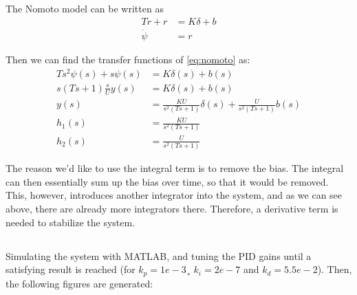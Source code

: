 The Nomoto model can be written as
\begin{equation}
\label{eq:nomoto}
	\begin{aligned}
		T \dot{r} + r &= K \delta + b \\
		\dot{\psi} &= r
	\end{aligned}
\end{equation}

Then we can find the transfer functions of \eqref{eq:nomoto} as: 
\begin{align*}
	T s^2 \psi(s) + s \psi(s) &= K \delta(s) + b(s) \\
	s(T s + 1) \frac{s}{U} y(s) &= K \delta(s) + b(s) \\
	y(s) &= \frac{K U}{s^2 (T s + 1)} \delta(s) + \frac{U}{s^2 (T s + 1)} b(s) \\ 
	h_1(s) &= \frac{K U}{s^2 (T s + 1)} \\
	h_2(s) &= \frac{U}{s^2 (T s + 1)}
\end{align*}

The reason we'd like to use the integral term is to remove the bias. The integral can then essentially sum up the bias over time, so that it would be removed. This, however, introduces another integrator into the system, and as we can see above, there are already more integrators there. Therefore, a derivative term is needed to stabilize the system.

\subsection{}
Simulating the system with MATLAB, and tuning the PID gains until a satisfying result is reached (for $k_p = 1e-3$¸ $k_i = 2e-7$ and $k_d = 5.5e-2$). Then, the following figures are generated: 


